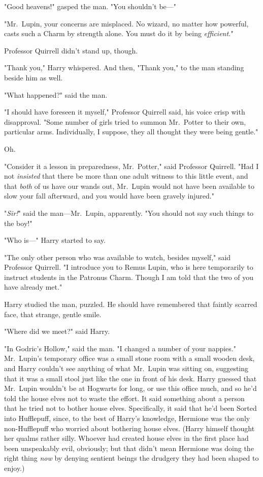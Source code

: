 "Good heavens!" gasped the man. "You shouldn't be---"

"Mr.~Lupin, your concerns are misplaced. No wizard, no matter how powerful, 
casts such a Charm by strength alone. You must do it by being \emph{efficient.}"

Professor Quirrell didn't stand up, though.

"Thank you," Harry whispered. And then, "Thank you," to the man standing beside 
him as well.

"What happened?" said the man.

"I should have foreseen it myself," Professor Quirrell said, his voice crisp 
with disapproval. "Some number of girls tried to summon Mr.~Potter to their 
own, particular arms. Individually, I suppose, they all thought they were being 
gentle."

Oh.

"Consider it a lesson in preparedness, Mr.~Potter," said Professor Quirrell. 
"Had I not \emph{insisted} that there be more than one adult witness to this 
little event, and that \emph{both} of us have our wands out, Mr.~Lupin would 
not have been available to slow your fall afterward, and you would have been 
gravely injured."

"\emph{Sir!}" said the man---Mr.~Lupin, apparently. "You should not say such 
things to the boy!"

"Who is---" Harry started to say.

"The only other person who was available to watch, besides myself," said 
Professor Quirrell. "I introduce you to Remus Lupin, who is here temporarily to 
instruct students in the Patronus Charm. Though I am told that the two of you 
have already met."

Harry studied the man, puzzled. He should have remembered that faintly scarred 
face, that strange, gentle smile.

"Where did we meet?" said Harry.

"In Godric's Hollow," said the man. "I changed a number of your nappies."
\sbreak
Mr.~Lupin's temporary office was a small stone room with a small wooden desk, 
and Harry couldn't see anything of what Mr.~Lupin was sitting on, suggesting 
that it was a small stool just like the one in front of his desk. Harry guessed 
that Mr.~Lupin wouldn't be at Hogwarts for long, or use this office much, and 
so he'd told the house elves not to waste the effort. It said something about a 
person that he tried not to bother house elves. Specifically, it said that he'd 
been Sorted into Hufflepuff, since, to the best of Harry's knowledge, Hermione 
was the only non-Hufflepuff who worried about bothering house elves. (Harry 
himself thought her qualms rather silly. Whoever had created house elves in the 
first place had been unspeakably evil, obviously; but that didn't mean Hermione 
was doing the right thing \emph{now} by denying sentient beings the drudgery 
they had been shaped to enjoy.)

